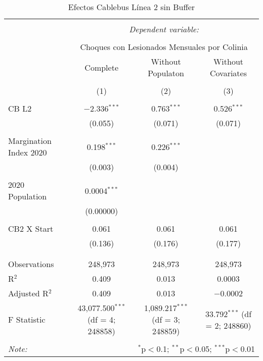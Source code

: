 
\begin{table}[!htbp] \centering 
  \caption{Efectos Cablebus Línea 2 sin Buffer} 
  \label{} 
\begin{tabular}{@{\extracolsep{5pt}}lccc} 
\\[-1.8ex]\hline 
\hline \\[-1.8ex] 
 & \multicolumn{3}{c}{\textit{Dependent variable:}} \\ 
\cline{2-4} 
\\[-1.8ex] & \multicolumn{3}{c}{Choques con Lesionados Mensuales por Colinia} \\ 
 & Complete & Without Populaton & Without Covariates \\ 
\\[-1.8ex] & (1) & (2) & (3)\\ 
\hline \\[-1.8ex] 
 CB L2 & $-$2.336$^{***}$ & 0.763$^{***}$ & 0.526$^{***}$ \\ 
  & (0.055) & (0.071) & (0.071) \\ 
  & & & \\ 
 Margination Index 2020 & 0.198$^{***}$ & 0.226$^{***}$ &  \\ 
  & (0.003) & (0.004) &  \\ 
  & & & \\ 
 2020 Population & 0.0004$^{***}$ &  &  \\ 
  & (0.00000) &  &  \\ 
  & & & \\ 
 CB2 X Start & 0.061 & 0.061 & 0.061 \\ 
  & (0.136) & (0.176) & (0.177) \\ 
  & & & \\ 
\hline \\[-1.8ex] 
Observations & 248,973 & 248,973 & 248,973 \\ 
R$^{2}$ & 0.409 & 0.013 & 0.0003 \\ 
Adjusted R$^{2}$ & 0.409 & 0.013 & $-$0.0002 \\ 
F Statistic & 43,077.500$^{***}$ (df = 4; 248858) & 1,089.217$^{***}$ (df = 3; 248859) & 33.792$^{***}$ (df = 2; 248860) \\ 
\hline 
\hline \\[-1.8ex] 
\textit{Note:}  & \multicolumn{3}{r}{$^{*}$p$<$0.1; $^{**}$p$<$0.05; $^{***}$p$<$0.01} \\ 
\end{tabular} 
\end{table} 
